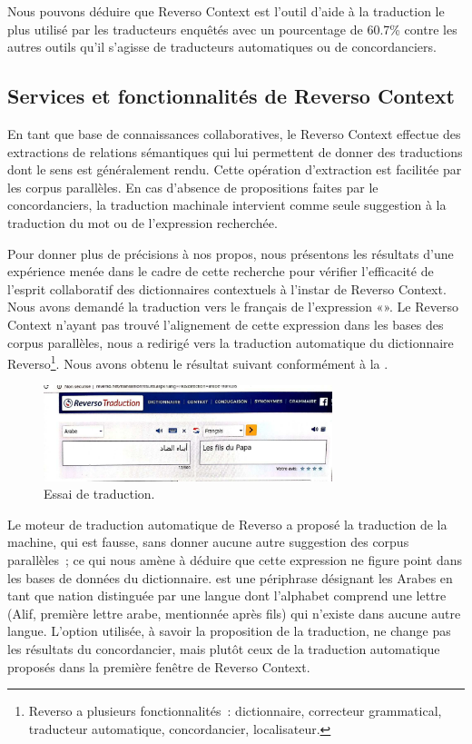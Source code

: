 \documentclass[french]{textolivre}
\begin{document}
Nous pouvons déduire que Reverso Context est l’outil d’aide à la traduction le plus utilisé par les traducteurs enquêtés avec un pourcentage de 60.7\% contre les autres outils qu’il s’agisse de traducteurs automatiques ou de concordanciers. 


\subsection{Services et fonctionnalités de Reverso Context}\label{sec-services}
En tant que base de connaissances collaboratives, le Reverso Context effectue des extractions de relations sémantiques qui lui permettent de donner des traductions dont le sens est généralement rendu. Cette opération d’extraction est facilitée par les corpus parallèles. En cas d’absence de propositions faites par le concordanciers, la traduction machinale intervient comme seule suggestion à la traduction du mot ou de l’expression recherchée.

Pour donner plus de précisions à nos propos, nous présentons les résultats d’une expérience menée dans le cadre de cette recherche pour vérifier l’efficacité de l’esprit collaboratif des dictionnaires contextuels à l’instar de Reverso Context. Nous avons demandé la traduction vers le français de l’expression «».
Le Reverso Context n’ayant pas trouvé l’alignement de cette expression dans les bases des corpus parallèles, nous a redirigé vers la traduction automatique du dictionnaire 
Reverso\footnote{
Reverso a plusieurs fonctionnalités : dictionnaire, correcteur grammatical, traducteur automatique, concordancier, localisateur.
}. Nous avons obtenu le résultat suivant conformément à la . 

\begin{figure}[htbp]
 \centering
 \includegraphics[width=0.75\textwidth]{figure05.pdf}
 \caption{Essai de traduction.}
 \label{fig-05}
\end{figure}

Le moteur de traduction automatique de Reverso a proposé la traduction de la machine, qui est fausse, sans donner aucune autre suggestion des corpus parallèles ; ce qui nous amène à déduire que cette expression ne figure point dans les bases de données du dictionnaire.
est une périphrase désignant les Arabes en tant que nation distinguée par une langue dont l’alphabet comprend une lettre (Alif, première lettre arabe, mentionnée après fils) qui n’existe dans aucune autre langue. L’option utilisée, à savoir la proposition de la traduction, ne change pas les résultats du concordancier, mais plutôt ceux de la traduction automatique proposés dans la première fenêtre de Reverso Context.
\end{document}
